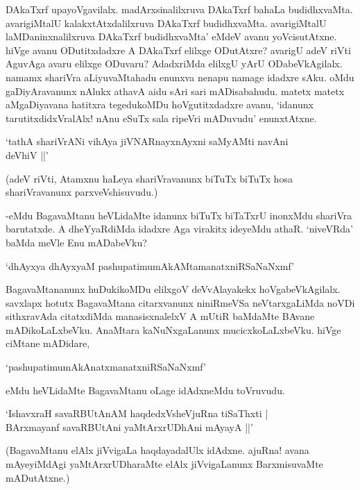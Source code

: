 DAkaTxrf upayoVgavilalx. madArxsinalilxruva DAkaTxrf bahaLa budidhxvaMta. avarigiMtalU kalakxtAtxdalilxruva DAkaTxrf budidhxvaMta. avarigiMtalU laMDaninxnalilxruva DAkaTxrf budidhxvaMta' eMdeV avanu yoVcisutAtxne. hiVge avanu ODutitxdadxre A DAkaTxrf elilxge ODutAtxre? avarigU adeV riVti AguvAga avaru elilxge ODuvaru? AdadxriMda elilxgU yArU ODabeVkAgilalx. namamx shariVra aLiyuvaMtahadu enunxva nenapu namage idadxre sAku. oMdu gaDiyAravanunx nAlukx athavA aidu sAri sari mADisabahudu. matetx matetx aMgaDiyavana hatitxra tegedukoMDu hoVgutitxdadxre avanu, `idanunx tarutitxdidxVralAlx! nAnu eSuTx sala ripeVri mADuvudu' enunxtAtxne.

\begin{shloka}
`tathA shariVrANi vihAya jiVNARnayxnAyxni saMyAMti navAni\\
\hspace{5.5cm} deVhiV ||'
\end{shloka}

(adeV riVti, Atamxnu haLeya shariVravanunx biTuTx biTuTx hosa shariVravanunx parxveVshisuvudu.)


-eMdu BagavaMtanu heVLidaMte idanunx biTuTx biTaTxrU inonxMdu shariVra barutatxde. A dheYyaRdiMda idadxre Aga virakitx ideyeMdu athaR. `niveVRda' baMda meVle Enu mADabeVku?

\begin{shloka}
`dhAyxya dhAyxyaM pashupatimumAkAMtamanatxniRSaNaNxmf'
\end{shloka}

BagavaMtananunx huDukikoMDu elilxgoV deVvAlayakekx hoVgabeVkAgilalx. savxlapx hotutx BagavaMtana citarxvanunx niniRmeVSa neVtarxgaLiMda noVDi sithxravAda citatxdiMda manasisxnalelxV A mUtiR baMdaMte BAvane mADikoLaLxbeVku. AnaMtara kaNuNxgaLanunx mucicxkoLaLxbeVku. hiVge ciMtane mADidare,

\begin{shloka}
`pashupatimumAkAnatxmanatxniRSaNaNxmf'
\end{shloka}

eMdu heVLidaMte BagavaMtanu oLage idAdxneMdu toVruvudu.

\begin{shloka}
`IshavxraH savaRBUtAnAM haqdedxVsheVjuRna tiSaThxti |\\
BArxmayanf savaRBUtAni yaMtArxrUDhAni mAyayA ||'
\end{shloka}

(BagavaMtanu elAlx jiVvigaLa haqdayadalUlx idAdxne. ajuRna! avana mAyeyiMdAgi yaMtArxrUDharaMte elAlx jiVvigaLanunx BarxmisuvaMte mADutAtxne.)

